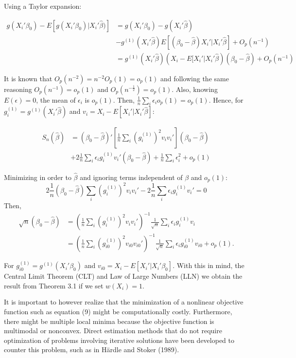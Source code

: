 \documentclass[a4paper]{article}
\begin{document}
Using a Taylor expansion:

\begin{align*}
g(X_i'\beta_0) - E[g(X_i'\beta_0)|X_i'\hat{\beta})] & = g(X_i'\beta_0) - g(X_i'\hat{\beta}) \\
											 & - g^{(1)}(X_i'\hat{\beta})E[(\beta_0 - \hat{\beta})X_i'|X_i'\hat{\beta}] + O_p(n^{-1}) \\
				                              & = g^{(1)}(X_i'\hat{\beta})( X_i - E[X_i'|X_i'\hat{\beta})(\beta_0 - \hat{\beta}) + O_p(n^{-1})
\end{align*}


It is known that $O_p(n^{-2}) = n^{-2}O_p(1) = o_p(1)$ and following the same reasoning $O_p(n^{-1}) = o_p(1)$ and $O_p(n^{-\frac{1}{2}}) = o_p(1)$. Also, knowing $E(\epsilon) = 0$, the mean of $\epsilon_i$ is $o_p(1)$. Then, $\frac{1}{n}\sum_i\epsilon_io_p(1) = o_p(1)$. Hence, for $g_{i}^{(1)} = g^{(1)}(X_i'\hat{\beta})$ and $v_i = X_i - E[X_i'|X_i'\hat{\beta}]$:

\begin{align*}
S_{n}(\hat{\beta}) & = (\beta_0 - \hat{\beta})'\left[\frac{1}{n}\sum_i (g_i^{(1)})^2v_iv_i'\right](\beta_0 - \hat{\beta}) \\
             & + 2\frac{1}{n}\sum_i\epsilon_ig_i^{(1)}v_i'(\beta_0 - \hat{\beta}) + \frac{1}{n}\sum_i \epsilon_i^2 + o_p(1)
\end{align*}

Minimizing in order to $\hat{\beta}$ and ignoring terms independent of $\beta$ and $o_p(1)$:
\[2\frac{1}{n}(\beta_0 - \hat{\beta})\sum_i(g_{i}^{(1)})^2v_iv_i' - 2\frac{1}{n}\sum_i\epsilon_ig_i^{(1)}v_i' = 0 \]
Then, 
\begin{align*}
\sqrt{n}(\beta_0 - \hat{\beta}) & = (\frac{1}{n}\sum_i(g_{i}^{(1)})^2v_iv_i')^{-1}\frac{1}{\sqrt{n}}\sum_i\epsilon_i g_{i}^{(1)}v_i \\
     					  & = (\frac{1}{n}\sum_i(g_{i0}^{(1)})^2v_{i0}v_{i0}')^{-1}\frac{1}{\sqrt{n}}\sum_i\epsilon_i g_{i0}^{(1)}v_{i0} + o_p(1).
\end{align*}

For $g_{i0}^{(1)} = g^{(1)}(X_i'\beta_0)$ and $v_{i0} = X_i - E[X_i'|X_i'\beta_0]$. With this in mind, the Central Limit Theorem (CLT) and Law of Large Numbers (LLN) we obtain the result from Theorem 3.1 if we set $w(X_i) = 1$.

It is important to however realize that the minimization of a nonlinear objective function such as equation (9) might be computationally costly. Furthermore, there might be multiple local minima because the objective function is multimodal or nonconvex. Direct estimation methods that do not require optimization of problems involving iterative solutions have been developed to counter this problem, such as in H{\"a}rdle and Stoker (1989).
\end{document}
